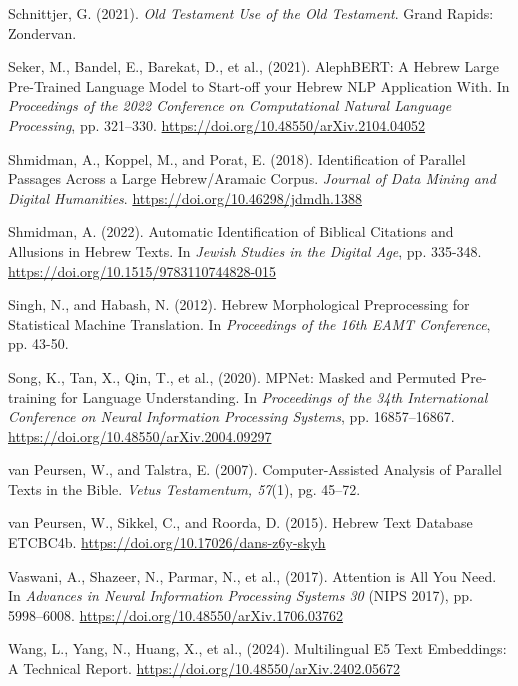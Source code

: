\documentclass[12pt]{article}
\begin{document}
\begin{thebibliography}{99}
 Schnittjer, G. (2021). \textit{Old Testament Use of the Old Testament}. Grand Rapids: Zondervan.

 Seker, M., Bandel, E., Barekat, D., et al., (2021). AlephBERT: A Hebrew Large Pre-Trained Language Model to Start-off your Hebrew NLP Application With. In \textit{Proceedings of the 2022 Conference on Computational Natural Language Processing}, pp. 321–330. \url{https://doi.org/10.48550/arXiv.2104.04052}

 Shmidman, A., Koppel, M., and Porat, E. (2018). Identification of Parallel Passages Across a Large Hebrew/Aramaic Corpus. \textit{Journal of Data Mining and Digital Humanities}. \url{https://doi.org/10.46298/jdmdh.1388}

 Shmidman, A. (2022). Automatic Identification of Biblical Citations and Allusions in Hebrew Texts. In \textit{Jewish Studies in the Digital Age}, pp. 335-348. \url{https://doi.org/10.1515/9783110744828-015}

 Singh, N., and Habash, N. (2012). Hebrew Morphological Preprocessing for Statistical Machine Translation. In \textit{Proceedings of the 16th EAMT Conference}, pp. 43-50.

 Song, K., Tan, X., Qin, T., et al., (2020). MPNet: Masked and Permuted Pre-training for Language Understanding. In \textit{Proceedings of the 34th International Conference on Neural Information Processing Systems}, pp. 16857–16867. \url{https://doi.org/10.48550/arXiv.2004.09297}

 van Peursen, W., and Talstra, E. (2007). Computer-Assisted Analysis of Parallel Texts in the Bible. \textit{Vetus Testamentum, 57}(1), pg. 45–72.

 van Peursen, W., Sikkel, C., and Roorda, D. (2015). Hebrew Text Database ETCBC4b. \url{https://doi.org/10.17026/dans-z6y-skyh}

 Vaswani, A., Shazeer, N., Parmar, N., et al., (2017). Attention is All You Need. In \textit{Advances in Neural Information Processing Systems 30} (NIPS 2017), pp. 5998–6008. \url{https://doi.org/10.48550/arXiv.1706.03762}

 Wang, L., Yang, N., Huang, X., et al., (2024). Multilingual E5 Text Embeddings: A Technical Report. \url{https://doi.org/10.48550/arXiv.2402.05672}

\end{thebibliography}
\end{document}
